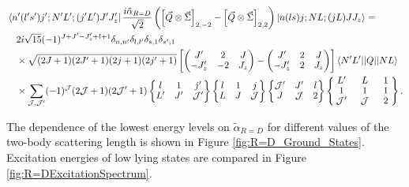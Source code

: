 \documentclass[%
 preprint,
 amsmath,amssymb,
 aps,
]{revtex4-1}
\newcommand{\threej}[6]{ \begin{pmatrix}
  #1 & #2 & #3 \\
  #4 & #5 & #6 
 \end{pmatrix}}
\newcommand{\sixj}[6]{ \begin{Bmatrix}
  #1 & #2 & #3 \\
  #4 & #5 & #6 
 \end{Bmatrix}}
\newcommand{\ninej}[9]{ \begin{Bmatrix}
  #1 & #2 & #3 \\
  #4 & #5 & #6 \\
  #7 & #8 & #9
 \end{Bmatrix}}
\begin{document}
\begin{equation}\begin{split}
&\bra{n'(l's')j';N'L';(j'L')J'J'_z}  \frac{i \tilde{\alpha}_{R=D}}{\sqrt{2}}\left(  \left[ \vec{Q} \otimes \vec{\Sigma} \right]_{2,-2} -  \left[ \vec{Q} \otimes \vec{\Sigma} \right]_{2,2} \right)  \ket{n(ls)j;NL;(jL)JJ_z} =  \\
&\quad2 i \sqrt{15}(-1)^{J+J'-J'_z+l+1}\delta_{n,n'}\delta_{l,l'}\delta_{s,1}\delta_{s',1}  \\
 &\quad\times \sqrt{(2J+1)(2J'+1)(2j+1)(2j'+1)} \left[\threej{J'}{2}{J}{-J'_z}{-2}{J_z}-\threej{J'}{2}{J}{-J'_z}{2}{J_z}\right] \braket{N' L' || Q || N L} \\ 
 &\quad\times\sum_{\mathcal{J},\mathcal{J}'} (-1)^\mathcal{J}(2\mathcal{J}+1)(2\mathcal{J}'+1)\sixj{l}{1}{j'}{L'}{J'}{\mathcal{J}'}\sixj{l}{1}{j}{L}{J}{\mathcal{J}}\sixj{\mathcal{J}'}{J'}{l}{J}{\mathcal{J}}{2}
 \renewcommand{\arraystretch}{0.9}
 \ninej{\hphantom{l}L'\hphantom{l}}{\hphantom{l}L\hphantom{l}}{\hphantom{l}1\hphantom{l}}{1}{1}{1}{\mathcal{J}'}{\mathcal{J}}{2} .
\end{split}
\end{equation}

The dependence of the lowest energy levels on $\tilde{\alpha}_{R=D}$ for different values of the two-body scattering length is shown in Figure \ref{fig:R=D_Ground_States}. Excitation energies of low lying states are compared in Figure \ref{fig:R=DExcitationSpectrum}.
\end{document}
